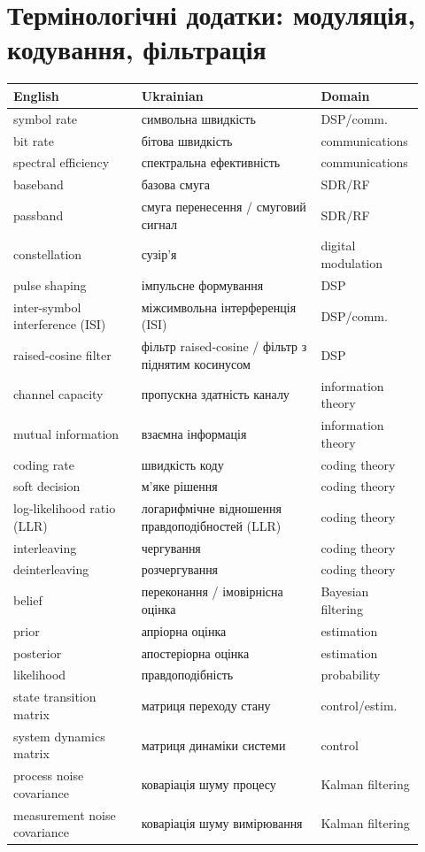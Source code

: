 \chapter{Термінологічні додатки: модуляція, кодування, фільтрація}
\label{app:terminology-session05}

\begin{longtable}{L{0.30\linewidth}L{0.42\linewidth}L{0.20\linewidth}}
\toprule
English & Ukrainian & Domain \\
\midrule
symbol rate & символьна швидкість & DSP/comm. \\
bit rate & бітова швидкість & communications \\
spectral efficiency & спектральна ефективність & communications \\
baseband & базова смуга & SDR/RF \\
passband & смуга перенесення / смуговий сигнал & SDR/RF \\
constellation & сузір'я & digital modulation \\
pulse shaping & імпульсне формування & DSP \\
inter-symbol interference (ISI) & міжсимвольна інтерференція (ISI) & DSP/comm. \\
raised-cosine filter & фільтр raised-cosine / фільтр з піднятим косинусом & DSP \\
channel capacity & пропускна здатність каналу & information theory \\
mutual information & взаємна інформація & information theory \\
coding rate & швидкість коду & coding theory \\
soft decision & м'яке рішення & coding theory \\
log-likelihood ratio (LLR) & логарифмічне відношення правдоподібностей (LLR) & coding theory \\
interleaving & чергування & coding theory \\
deinterleaving & розчергування & coding theory \\
belief & переконання / імовірнісна оцінка & Bayesian filtering \\
prior & апріорна оцінка & estimation \\
posterior & апостеріорна оцінка & estimation \\
likelihood & правдоподібність & probability \\
state transition matrix & матриця переходу стану & control/estim. \\
system dynamics matrix & матриця динаміки системи & control \\
process noise covariance & коваріація шуму процесу & Kalman filtering \\
measurement noise covariance & коваріація шуму вимірювання & Kalman filtering \\
\bottomrule
\end{longtable}
